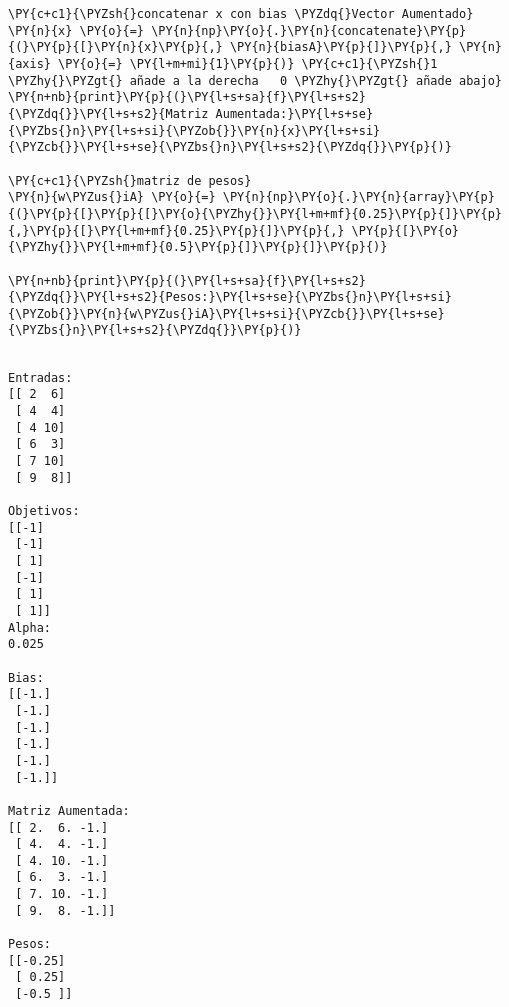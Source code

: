 \begin{tcolorbox}[breakable, size=fbox, boxrule=1pt, pad at break*=1mm,colback=cellbackground, colframe=cellborder]
\begin{Verbatim}[commandchars=\\\{\}]
\PY{c+c1}{\PYZsh{}concatenar x con bias \PYZdq{}Vector Aumentado}
\PY{n}{x} \PY{o}{=} \PY{n}{np}\PY{o}{.}\PY{n}{concatenate}\PY{p}{(}\PY{p}{[}\PY{n}{x}\PY{p}{,} \PY{n}{biasA}\PY{p}{]}\PY{p}{,} \PY{n}{axis} \PY{o}{=} \PY{l+m+mi}{1}\PY{p}{)} \PY{c+c1}{\PYZsh{}1 \PYZhy{}\PYZgt{} añade a la derecha   0 \PYZhy{}\PYZgt{} añade abajo}
\PY{n+nb}{print}\PY{p}{(}\PY{l+s+sa}{f}\PY{l+s+s2}{\PYZdq{}}\PY{l+s+s2}{Matriz Aumentada:}\PY{l+s+se}{\PYZbs{}n}\PY{l+s+si}{\PYZob{}}\PY{n}{x}\PY{l+s+si}{\PYZcb{}}\PY{l+s+se}{\PYZbs{}n}\PY{l+s+s2}{\PYZdq{}}\PY{p}{)}

\PY{c+c1}{\PYZsh{}matriz de pesos}
\PY{n}{w\PYZus{}iA} \PY{o}{=} \PY{n}{np}\PY{o}{.}\PY{n}{array}\PY{p}{(}\PY{p}{[}\PY{p}{[}\PY{o}{\PYZhy{}}\PY{l+m+mf}{0.25}\PY{p}{]}\PY{p}{,}\PY{p}{[}\PY{l+m+mf}{0.25}\PY{p}{]}\PY{p}{,} \PY{p}{[}\PY{o}{\PYZhy{}}\PY{l+m+mf}{0.5}\PY{p}{]}\PY{p}{]}\PY{p}{)}

\PY{n+nb}{print}\PY{p}{(}\PY{l+s+sa}{f}\PY{l+s+s2}{\PYZdq{}}\PY{l+s+s2}{Pesos:}\PY{l+s+se}{\PYZbs{}n}\PY{l+s+si}{\PYZob{}}\PY{n}{w\PYZus{}iA}\PY{l+s+si}{\PYZcb{}}\PY{l+s+se}{\PYZbs{}n}\PY{l+s+s2}{\PYZdq{}}\PY{p}{)}
\end{Verbatim}
\end{tcolorbox}

    \begin{Verbatim}[commandchars=\\\{\}]

Entradas:
[[ 2  6]
 [ 4  4]
 [ 4 10]
 [ 6  3]
 [ 7 10]
 [ 9  8]]

Objetivos:
[[-1]
 [-1]
 [ 1]
 [-1]
 [ 1]
 [ 1]]
Alpha:
0.025

Bias:
[[-1.]
 [-1.]
 [-1.]
 [-1.]
 [-1.]
 [-1.]]

Matriz Aumentada:
[[ 2.  6. -1.]
 [ 4.  4. -1.]
 [ 4. 10. -1.]
 [ 6.  3. -1.]
 [ 7. 10. -1.]
 [ 9.  8. -1.]]

Pesos:
[[-0.25]
 [ 0.25]
 [-0.5 ]]

    \end{Verbatim}

